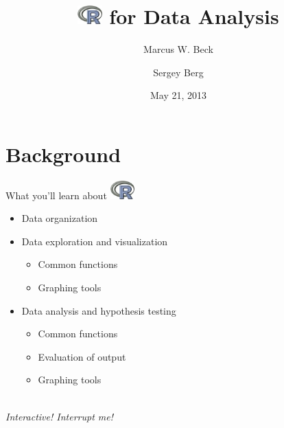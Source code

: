\documentclass[xcolor=svgnames]{beamer}
\begin{document}
\title[R for Data Analysis]{\includegraphics[width=0.07\textwidth]{Rlogo.jpg} \hspace{0.2em} for Data Analysis}
\author[M. Beck and S. Berg]{Marcus W. Beck \and Sergey Berg}


\date{May 21, 2013}


\begin{frame}
\vspace{-0.3in}
\titlepage
\end{frame}

\section{Background}

\begin{frame}{What you'll learn about \hspace{0.2em}\includegraphics[width=0.07\textwidth]{Rlogo.jpg}}
\begin{itemize}
\itemsep20pt
\item Data organization
\item Data exploration and visualization
\begin{itemize}
\item Common functions
\item Graphing tools
\end{itemize}
\item Data analysis and hypothesis testing
\begin{itemize}
\item Common functions
\item Evaluation of output 
\item Graphing tools \\~\\
\end{itemize}
\end{itemize}

\Large
\centerline{\emph{Interactive! Interrupt me!}}
\end{frame}
\end{document}
